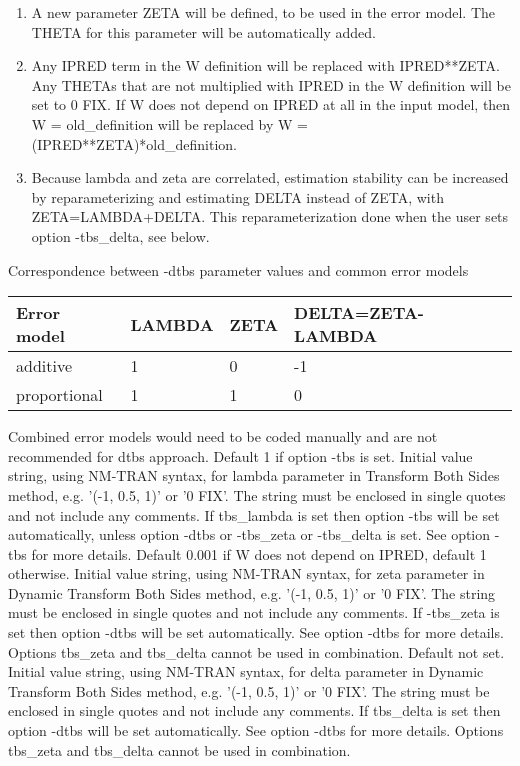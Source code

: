 \begin{optionlist}
\begin{enumerate}
\item A new parameter ZETA will be defined, to be used in the error model. The THETA for this parameter will be automatically added.
\item Any IPRED term in the W definition will be replaced with IPRED**ZETA.
Any THETAs that are not multiplied with IPRED in the W definition will be set to 0 FIX.
If W does not depend on IPRED at all in the input model, then W = old\_definition will be replaced by
W = (IPRED**ZETA)*old\_definition.
\item Because lambda and zeta are correlated, estimation stability can be increased 
by reparameterizing and estimating DELTA instead of ZETA, with ZETA=LAMBDA+DELTA. 
This reparameterization done when the user sets option -tbs\_delta, see below.
\end{enumerate}
Correspondence between -dtbs parameter values and common error models\\
\begin{tabular}{|l|l|l|l|}
\hline
Error model & LAMBDA & ZETA & DELTA=ZETA-LAMBDA\\
\hline
additive & 1 & 0 & -1 \\
\hline
proportional & 1 & 1 & 0 \\
\hline
\end{tabular}
Combined error models would need to be coded manually and are not recommended for dtbs approach.
\nextopt
{}
Default 1 if option -tbs is set. Initial value string, using NM-TRAN syntax, for lambda parameter in Transform Both Sides method, e.g. '(-1, 0.5, 1)' or '0 FIX'. The string must be enclosed in single quotes and not include any comments. If tbs\_lambda is set then option -tbs will be set automatically, unless option -dtbs or -tbs\_zeta or -tbs\_delta is set. 
See option -tbs for more details. 
\nextopt
{}
Default 0.001 if W does not depend on IPRED, default 1 otherwise. Initial value string, using NM-TRAN syntax, for zeta parameter in Dynamic Transform Both Sides method, e.g. '(-1, 0.5, 1)' or '0 FIX'. The string must be enclosed in single quotes and not include any comments. If -tbs\_zeta is set then option -dtbs will be set automatically. See option -dtbs for more details. Options tbs\_zeta and tbs\_delta cannot be used in combination.  
\nextopt
{}
Default not set. Initial value string, using NM-TRAN syntax, for delta parameter in Dynamic Transform Both Sides method, e.g. '(-1, 0.5, 1)' or '0 FIX'. The string must be enclosed in single quotes and not include any comments. If tbs\_delta is set then option -dtbs will be set automatically. See option -dtbs for more details. Options tbs\_zeta and tbs\_delta cannot be used in combination.  

\end{optionlist}
